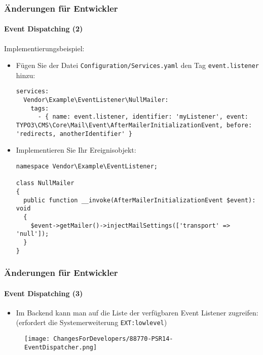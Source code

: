 \begin{frame}[fragile]
	\frametitle{Änderungen für Entwickler}
	\framesubtitle{Event Dispatching (2)}

	\lstset{basicstyle=\tiny\ttfamily}

	Implementierungsbeispiel:

	\begin{itemize}\smaller
		\item[\ding{202}] Fügen Sie der Datei \texttt{Configuration/Services.yaml} den Tag \texttt{event.listener} hinzu:

\begin{lstlisting}
services:
  Vendor\Example\EventListener\NullMailer:
    tags:
      - { name: event.listener, identifier: 'myListener', event: TYPO3\CMS\Core\Mail\Event\AfterMailerInitializationEvent, before: 'redirects, anotherIdentifier' }
\end{lstlisting}

		\item[\ding{203}] Implementieren Sie Ihr Ereignisobjekt:

\begin{lstlisting}
namespace Vendor\Example\EventListener;

class NullMailer
{
  public function __invoke(AfterMailerInitializationEvent $event): void
  {
    $event->getMailer()->injectMailSettings(['transport' => 'null']);
  }
}
\end{lstlisting}

	\end{itemize}\normalsize

\end{frame}


\begin{frame}[fragile]
	\frametitle{Änderungen für Entwickler}
	\framesubtitle{Event Dispatching (3)}

	\lstset{basicstyle=\tiny\ttfamily}

	\begin{itemize}
		\item Im Backend kann man auf die Liste der verfügbaren Event Listener zugreifen:\newline
			\smaller
				(erfordert die Systemerweiterung \texttt{EXT:lowlevel})
			\normalsize
	\end{itemize}

	\begin{figure}
		\texttt{[image: ChangesForDevelopers/88770-PSR14-EventDispatcher.png]}
	\end{figure}

\end{frame}



